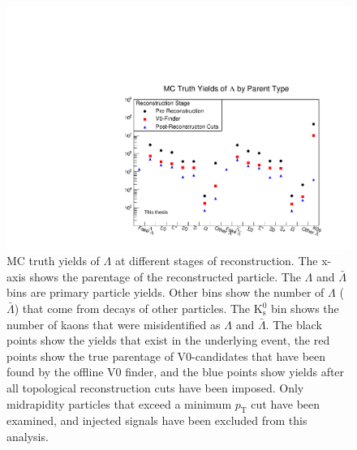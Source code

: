 \begin{figure}[hbtp]
\includegraphics[width=36pc]{Figures/2014-02-03-MCYields.pdf}
\caption[$\Lambda$ MC Yields at Different Reconstruction Stages]{
MC truth yields of $\Lambda$ at different stages of reconstruction.
The x-axis shows the parentage of the reconstructed particle. 
The $\Lambda$ and $\bar{\Lambda}$ bins are primary particle yields.  
Other bins show the number of $\Lambda$ ($\bar{\Lambda}$) that come from decays of other particles. 
The $\mathrm{K^0_s}$ bin shows the number of kaons that were misidentified as $\Lambda$ and $\bar{\Lambda}$.
The black points show the yields that exist in the underlying event, the red points show the true parentage of V0-candidates that have been found by the offline V0 finder, and the blue points show yields after all topological reconstruction cuts have been imposed.
Only midrapidity particles that exceed a minimum $p_\mathrm{T}$ cut have been examined, and injected signals have been excluded from this analysis.}
\label{fig:MCYields}
\end{figure}


